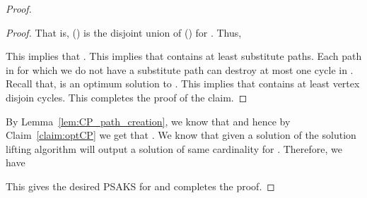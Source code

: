 \begin{proof}
\begin{proof}
That is,  () is the disjoint union of  () for . Thus, 

This implies that . This implies that   contains at least  substitute paths. Each path in  for which we do not have a substitute path can destroy at most one cycle in 
. Recall that,   is an optimum solution to . This implies that 
contains at least  vertex disjoin cycles. 
This completes the proof of the claim. 
\end{proof}
By Lemma~\ref{lem:CP_path_creation}, we know that  and hence 
by Claim~\ref{claim:optCP} we get that .   
We know that given a solution  of  the solution lifting algorithm will output a solution  of same cardinality
for . Therefore, we have  

This gives the desired PSAKS for \CP{} and completes the proof.
\end{proof}


